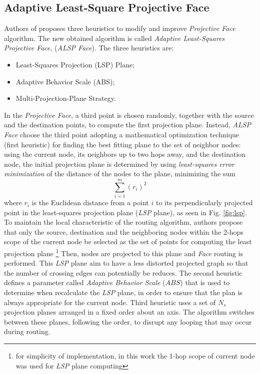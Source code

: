 \documentclass[journal,comsoc]{IEEEtran}
\begin{document}
\subsection{Adaptive Least-Square Projective Face}
Authors of \cite{kao:nearly} proposes three heuristics to modify and improve \emph{Projective Face} algorithm. The new obtained algorithm is called \emph{Adaptive Least-Squares Projective Face}, (\emph{ALSP Face}). The three heuristics are:
\begin{itemize}
\item Least-Squares Projection (LSP) Plane;
\item Adaptive Behavior Scale (ABS);
\item Multi-Projection-Plane Strategy.
\end{itemize}
 In the \emph{Projective Face}, a third point is chosen randomly, together with the source and the destination points, to compute the first projection plane. Instead, \emph{ALSP Face} choose the third point adopting a mathematical optimization technique (first heuristic) for finding the best fitting plane to the set of neighbor nodes: using the current node, its neighbors up to two hops away, and the destination node, the initial projection plane is determined by using \emph{least-squares error minimization} of the distance of the nodes to the plane, minimizing the sum 
   \[  \sum^{m}_{i=1}(r_i)^2  \]
where \(r_i\) is the Euclidean distance from a point \(i\) to its perpendicularly projected point in the least-squares projection plane (\emph{LSP} plane), as seen in Fig. \ref{fig:lsp}. To maintain the local characteristic of the routing algorithm, authors propose that only the source, destination and the neighboring nodes within the 2-hops scope of the current node be selected as the set of points for computing the least projection plane \footnote{for simplicity of implementation, in this work the 1-hop scope of current node was used for \emph{LSP} plane computing} Then, nodes are projected to this plane and \emph{Face} routing is performed. This \emph{LSP} plane aim to have a less distorted projected graph so that the number of crossing edges can potentially be reduces. The second heuristic defines a parameter called \emph{Adaptive Behavior Scale} (\(ABS\)) that is used to determine when recalculate the \emph{LSP} plane, in order to ensure that the plan is always appropriate for the current node. Third heuristic uses a set of \(N_s\) projection planes arranged in a fixed order about an axis. The algorithm switches between these planes, following the order, to disrupt any looping that may occur during routing.
\end{document}
